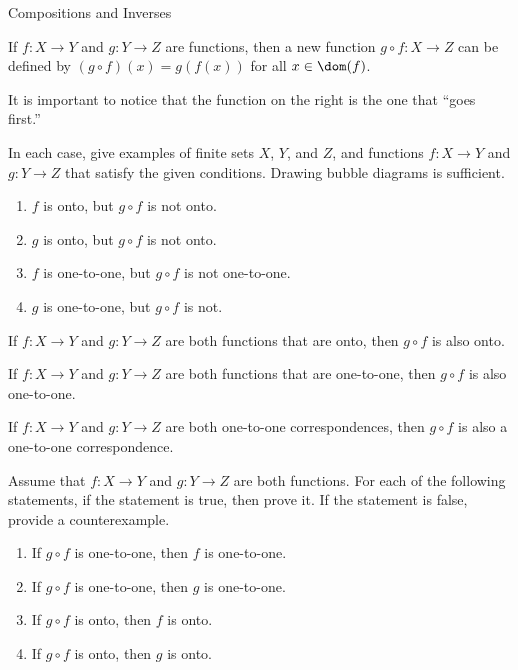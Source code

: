 \begin{section}{Compositions and Inverses}

\begin{definition}
If $f:X\to Y$ and $g:Y\to Z$ are functions, then a new function $g\circ f:X\to Z$ can be defined by $(g\circ f)(x)=g(f(x))$ for all $x\in\dom(f)$.
\end{definition}

It is important to notice that the function on the right is the one that ``goes first.''

\begin{exercise}
In each case, give examples of finite sets $X$, $Y$, and $Z$, and functions $f:X\to Y$ and $g:Y\to Z$ that satisfy the given conditions.  Drawing bubble diagrams is sufficient.
\begin{enumerate}[label=\textrm{(\alph*)}]
\item $f$ is onto, but $g\circ f$ is not onto.
\item $g$ is onto, but $g\circ f$ is not onto.
\item $f$ is one-to-one, but $g\circ f$ is not one-to-one.
\item $g$ is one-to-one, but $g\circ f$ is not.
\end{enumerate}
\end{exercise}

\begin{theorem}
If $f:X\to Y$ and $g:Y\to Z$ are both functions that are onto, then $g\circ f$ is also onto.
\end{theorem}

\begin{theorem}
If $f:X\to Y$ and $g:Y\to Z$ are both functions that are one-to-one, then $g\circ f$ is also one-to-one.
\end{theorem}

\begin{corollary}
If $f:X\to Y$ and $g:Y\to Z$ are both one-to-one correspondences, then $g\circ f$ is also a one-to-one correspondence.
\end{corollary}

\begin{problem}
Assume that $f:X\to Y$ and $g:Y\to Z$ are both functions.  For each of the following statements, if the statement is true, then prove it.  If the statement is false, provide a counterexample.
\begin{enumerate}[label=\textrm{(\alph*)}]
\item If $g\circ f$ is one-to-one, then $f$ is one-to-one.
\item If $g\circ f$ is one-to-one, then $g$ is one-to-one.
\item If $g\circ f$ is onto, then $f$ is onto.
\item If $g\circ f$ is onto, then $g$ is onto.
\end{enumerate}
\end{problem}


\end{section}
